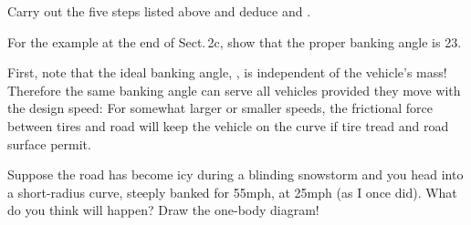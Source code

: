 {\tryit Carry out the five steps listed above and deduce 
and .

\tryit For the example at the end of Sect.\,2c, show that the proper banking
angle is {23\degrees}. 

First, note that the ideal banking angle, \m{\theta}, is independent of the
vehicle's mass!
Therefore the same banking angle can serve all vehicles provided they move
with the design speed:
%
%
For somewhat larger or smaller speeds, the frictional force between tires
and road will keep the vehicle on the curve if tire tread and road surface
permit.

\tryit Suppose the road has become icy during a blinding snowstorm and you
head into a short-radius curve, steeply banked for 55\unit{mph}, at 25\unit{mph} (as I
once did).
What do you think will happen?
Draw the one-body diagram!
}%
%
